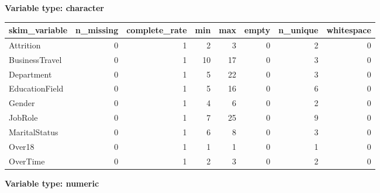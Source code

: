 \documentclass[
]{article}
\begin{document}
\textbf{Variable type: character}

\begin{longtable}[]{@{}lrrrrrrr@{}}
\toprule
skim\_variable & n\_missing & complete\_rate & min & max & empty &
n\_unique & whitespace\tabularnewline
\midrule
\endhead
Attrition & 0 & 1 & 2 & 3 & 0 & 2 & 0\tabularnewline
BusinessTravel & 0 & 1 & 10 & 17 & 0 & 3 & 0\tabularnewline
Department & 0 & 1 & 5 & 22 & 0 & 3 & 0\tabularnewline
EducationField & 0 & 1 & 5 & 16 & 0 & 6 & 0\tabularnewline
Gender & 0 & 1 & 4 & 6 & 0 & 2 & 0\tabularnewline
JobRole & 0 & 1 & 7 & 25 & 0 & 9 & 0\tabularnewline
MaritalStatus & 0 & 1 & 6 & 8 & 0 & 3 & 0\tabularnewline
Over18 & 0 & 1 & 1 & 1 & 0 & 1 & 0\tabularnewline
OverTime & 0 & 1 & 2 & 3 & 0 & 2 & 0\tabularnewline
\bottomrule
\end{longtable}

\textbf{Variable type: numeric}
\end{document}
